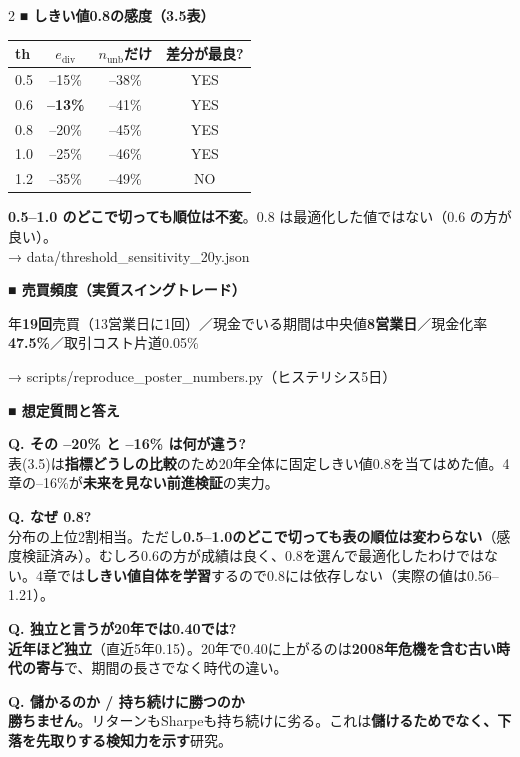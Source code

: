 \documentclass[9pt,a4paper]{article}
\newcommand{\ediv}{e_{\mathrm{div}}}
\newcommand{\nunb}{n_{\mathrm{unb}}}
\newcommand{\qa}[2]{{\color{accent}\textbf{Q. #1}}\\ #2 \par\smallskip}
\begin{document}
\begin{multicols}{2}
\vspace{2mm}
{\color{accent}\textbf{■ しきい値0.8の感度（3.5表）}}\par\smallskip
{\small
\begin{tabular}{@{}lccc@{}}
\toprule
th & $\ediv$ & $\nunb$だけ & 差分が最良?\\
\midrule
0.5 & --15\% & --38\% & YES\\
0.6 & \textbf{--13\%} & --41\% & YES\\
0.8 & --20\% & --45\% & YES\\
1.0 & --25\% & --46\% & YES\\
1.2 & --35\% & --49\% & NO\\
\bottomrule
\end{tabular}\par\smallskip
\textbf{0.5--1.0 のどこで切っても順位は不変}。0.8 は最適化した値ではない（0.6 の方が良い）。\\
{\color{muted}→ data/threshold\_sensitivity\_20y.json}
}

\vspace{2mm}
{\color{accent}\textbf{■ 売買頻度（実質スイングトレード）}}\par\smallskip
{\small
年\textbf{19回}売買（13営業日に1回）／現金でいる期間は中央値\textbf{8営業日}／現金化率\textbf{47.5\%}／取引コスト片道0.05\%\par\smallskip
{\color{muted}→ scripts/reproduce\_poster\_numbers.py（ヒステリシス5日）}
}

\columnbreak

{\color{warn}\textbf{■ 想定質問と答え}}\par\smallskip
{\small
\qa{その --20\% と --16\% は何が違う?}{表(3.5)は\textbf{指標どうしの比較}のため20年全体に固定しきい値0.8を当てはめた値。4章の--16\%が\textbf{未来を見ない前進検証}の実力。}

\qa{なぜ 0.8?}{分布の上位2割相当。ただし\textbf{0.5--1.0のどこで切っても表の順位は変わらない}（感度検証済み）。むしろ0.6の方が成績は良く、0.8を選んで最適化したわけではない。4章では\textbf{しきい値自体を学習}するので0.8には依存しない（実際の値は0.56--1.21）。}

\qa{独立と言うが20年では0.40では?}{\textbf{近年ほど独立}（直近5年0.15）。20年で0.40に上がるのは\textbf{2008年危機を含む古い時代の寄与}で、期間の長さでなく時代の違い。}

\qa{儲かるのか / 持ち続けに勝つのか}{\textbf{勝ちません}。リターンもSharpeも持ち続けに劣る。これは\textbf{儲けるためでなく、下落を先取りする検知力を示す}研究。}

}
\end{multicols}
\end{document}
